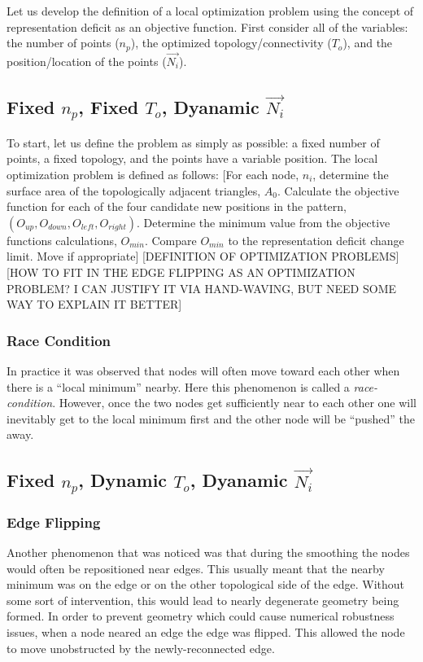 Let us develop the definition of a local optimization problem using the
concept of representation deficit as an objective function. First
consider all of the variables: the number of points ($n_p$), the
optimized topology/connectivity ($T_o$), and the position/location of
the points ($\vec{N_i}$).

\subsection{Fixed $n_p$, Fixed $T_o$, Dyanamic $\vec{N_i}$}
To start, let us define the problem as simply as possible: a fixed
number of points, a fixed topology, and the points have a variable
position.  The local optimization problem is defined as follows: [For
each node, $n_i$, determine the surface area of the topologically
adjacent triangles, $A_0$. Calculate the objective function for each of
the four candidate new positions in the pattern, $\left(O_{up},
O_{down}, O_{left}, O_{right}\right)$. Determine the minimum value from
the objective functions calculations, $O_{min}$. Compare $O_{min}$ to
the representation deficit change limit. Move if appropriate]
[DEFINITION OF OPTIMIZATION PROBLEMS]
[HOW TO FIT IN THE EDGE FLIPPING AS AN OPTIMIZATION PROBLEM? I CAN
JUSTIFY IT VIA HAND-WAVING, BUT NEED SOME WAY TO EXPLAIN IT BETTER]

\subsubsection{Race Condition}
In practice it was observed that nodes will often move toward each other
when there is a ``local minimum'' nearby. Here this phenomenon is called
a {\it race-condition}. However, once the two nodes get sufficiently
near to each other one will inevitably get to the local minimum first
and the other node will be ``pushed'' the away.

\subsection{Fixed $n_p$, Dynamic $T_o$, Dyanamic $\vec{N_i}$}
\subsubsection{Edge Flipping}
Another phenomenon that was noticed was that during the smoothing the
nodes would often be repositioned near edges. This usually meant that
the nearby minimum was on the edge or on the other topological side of
the edge. Without some sort of intervention, this would lead to nearly
degenerate geometry being formed. In order to prevent geometry which
could cause numerical robustness issues, when a node neared an edge the
edge was flipped. This allowed the node to move unobstructed by the
newly-reconnected edge.

